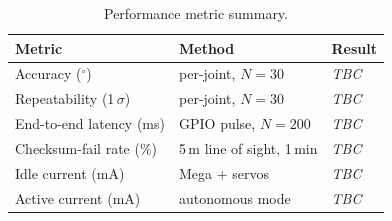 \begin{table}[t]
  \centering
  \caption{Performance metric summary.}
  \label{tab:results}
  \footnotesize
  \begin{tabularx}{\columnwidth}{lXl}
    \toprule
    \textbf{Metric} & \textbf{Method} & \textbf{Result} \\
    \midrule
    Accuracy ($^\circ$)        & per-joint, $N=30$           & \emph{TBC} \\
    Repeatability (1\,$\sigma$)& per-joint, $N=30$           & \emph{TBC} \\
    End-to-end latency (ms)    & GPIO pulse, $N=200$         & \emph{TBC} \\
    Checksum-fail rate (\%)    & 5\,m line of sight, 1\,min  & \emph{TBC} \\
    Idle current (mA)          & Mega + servos               & \emph{TBC} \\
    Active current (mA)        & autonomous mode             & \emph{TBC} \\
    \bottomrule
  \end{tabularx}
\end{table}


